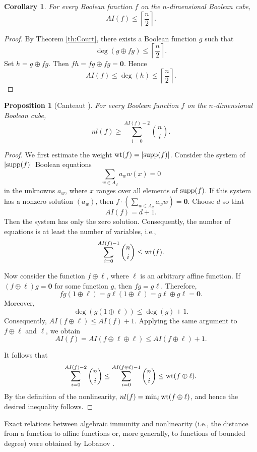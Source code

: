 \documentclass[11pt]{article}
\newtheorem{claim}{Proposition}[section]
\newtheorem{corollary}{Corollary}[section]
\theoremstyle{definition}
\newcommand{\supp}{{\rm supp}}
\newcommand{\wt}{{\rm wt}}
\begin{document}
{{{\begin{corollary}
For every Boolean function $f$ on the $n$-dimensional Boolean cube,
\[
AI(f)\leq\left\lceil\frac n2\right\rceil.
\]
\end{corollary}

\begin{proof}
By Theorem \ref{th:Court}, there exists a Boolean function $g$ such
that
\[
\deg(g\oplus fg)\leq\left\lceil\frac n2\right\rceil.
\]
Set
$h=g\oplus fg$.
Then
$fh=fg\oplus fg=\mathbf{0}$.
Hence
\[
AI(f)\leq\deg(h)\leq\left\lceil\frac n2\right\rceil.
\]
\end{proof}

\begin{claim}[Canteaut \cite{Canteaut}]
For every Boolean function $f$ on the $n$-dimensional Boolean cube,
\[
nl(f)\geq
\sum_{i=0}^{AI(f)-2}{n\choose i}.
\]
\end{claim}

\begin{proof}
We first estimate the weight
$\wt(f)=|\supp(f)|$.
Consider the system of $|\supp(f)|$ Boolean equations
\[
\sum_{w\in A_d}a_w w(x)=0
\]
in the unknowns $a_w$, where $x$ ranges over all elements of
$\supp(f)$. If this system has a nonzero solution $(a_w)$, then
$
f\cdot\left(\sum_{w\in A_d}a_w w\right)=\mathbf{0}$.
Choose $d$ so that
\[
AI(f)=d+1.
\]
Then the system has only the zero solution. Consequently, the number
of equations is at least the number of variables, i.e.,
\[
\sum_{i=0}^{AI(f)-1}{n\choose i}\leq\wt(f).
\]

Now consider the function
$f\oplus\ell$,
where $\ell$ is an arbitrary affine function. If
$(f\oplus\ell)g=\mathbf{0}$
for some function $g$, then
$
fg=g\ell$.
Therefore,
\[
fg(1\oplus\ell)
=
g\ell(1\oplus\ell)
=
g\ell\oplus g\ell
=
\mathbf{0}.
\]
Moreover,
\[
\deg(g(1\oplus\ell))\leq\deg(g)+1.
\]
Consequently,
$AI(f\oplus\ell)\leq AI(f)+1$.
Applying the same argument to $f\oplus\ell$ and $\ell$, we obtain
\[
AI(f)=AI(f\oplus\ell\oplus\ell)
\leq AI(f\oplus\ell)+1.
\]

It follows that
\[
\sum_{i=0}^{AI(f)-2}{n\choose i}
\leq
\sum_{i=0}^{AI(f\oplus\ell)-1}{n\choose i}
\leq
\wt(f\oplus\ell).
\]
By the definition of the nonlinearity,
$nl(f)=\min_\ell\wt(f\oplus\ell)$,
and hence the desired inequality follows.
\end{proof}

Exact relations between algebraic immunity and nonlinearity
(i.e., the distance from a function to affine functions or, more
generally, to functions of bounded degree) were obtained by
Lobanov \cite{Loban}.



}}}
\end{document}
